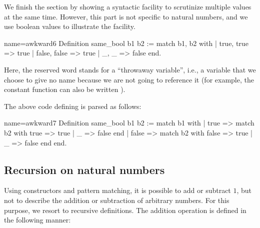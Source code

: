 We finish the section by showing a syntactic facility to scrutinize
multiple values at the same time.  However, this part is not specific to
natural numbers, and we use boolean values to illustrate the facility.

\begin{coq}{name=awkward6}{}
Definition same_bool b1 b2 :=
  match b1, b2 with
  | true, true => true
  | false, false => true
  | _, _ => false
  end.
\end{coq}

Here, the reserved word \C{_} stands for a ``throwaway variable'', i.e.,
a variable that we choose to give no name because we are not going to
reference it (for example, the constant function
 can also be written
).
\index[coq]{\C{_}}

The above code defining  is parsed as follows:

\begin{coq}{name=awkward7}{}
Definition same_bool b1 b2 :=
  match b1 with
  | true => match b2 with true => true | _ => false end
  | false => match b2 with false => true | _ => false end
  end.
\end{coq}


\subsection{Recursion on natural numbers}\label{ssec:recnat}


Using constructors and pattern matching, it is possible to add or
subtract \(1\), but not to describe the addition or subtraction of
arbitrary numbers. For this purpose, we resort to recursive
definitions. The addition operation is defined in the
following manner:

